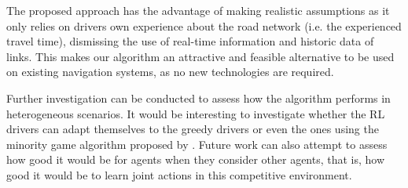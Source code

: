 \documentclass[12pt]{llncs}
\begin{document}
The proposed approach has the advantage of making realistic assumptions as it only relies on drivers own experience about the road network (i.e. the experienced travel time), dismissing the use of real-time information and historic data of links. This makes our algorithm an attractive and feasible alternative to be used on existing navigation systems, as no new technologies are required.

Further investigation can be conducted to assess how the algorithm performs in heterogeneous scenarios. It would be interesting to investigate whether the RL drivers can adapt themselves to the greedy drivers or even the ones using the minority game algorithm proposed by \cite{Galib&Moser2011}. Future work can also attempt to assess how good it would be for agents when they consider other agents, that is, how good it would be to learn joint actions in this competitive environment.


 
\end{document}
